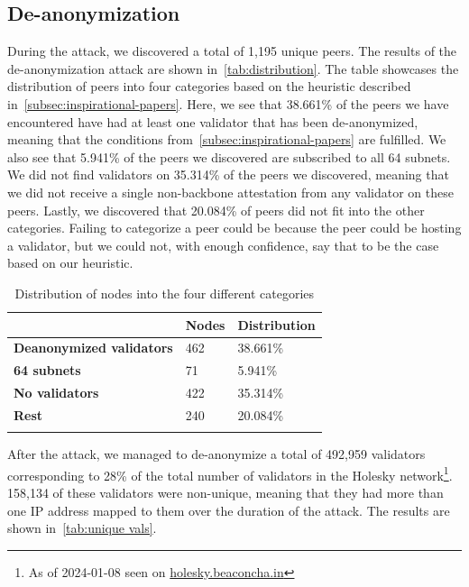 \subsection{De-anonymization}\label{subsec:de-anonymization}
During the attack, we discovered a total of 1,195 unique peers.
The results of the de-anonymization attack are shown in~\autoref{tab:distribution}.
The table showcases the distribution of peers into four categories based on the heuristic described in~\autoref{subsec:inspirational-papers}.
Here, we see that 38.661\% of the peers we have encountered have had at least one validator that has been de-anonymized, meaning that the conditions from~\autoref{subsec:inspirational-papers} are fulfilled.
We also see that 5.941\% of the peers we discovered are subscribed to all 64 subnets.
We did not find validators on 35.314\% of the peers we discovered, meaning that we did not receive a single non-backbone attestation from any validator on these peers.
Lastly, we discovered that 20.084\% of peers did not fit into the other categories.
Failing to categorize a peer could be because the peer could be hosting a validator, but we could not, with enough confidence, say that to be the case based on our heuristic.


\begin{table}[]
    \centering
    \caption{Distribution of nodes into the four different categories}
    \begin{tabular}{lll}
        \hline
        & \textbf{Nodes} & \textbf{Distribution} \\ \hline
        \textbf{Deanonymized validators} & 462            & 38.661\%                 \\
        \textbf{64 subnets}              & 71             & 5.941\%                  \\
        \textbf{No validators}           & 422              & 35.314\%               \\
        \textbf{Rest}                    & 240            & 20.084\%                 \\ \hline
        \\
    \end{tabular}
    \label{tab:distribution}
\end{table}


After the attack, we managed to de-anonymize a total of 492,959 validators corresponding to 28\% of the total number of validators in the Holesky network\footnote{As of 2024-01-08 seen on \href{https://holesky.beaconcha.in/}{holesky.beaconcha.in}}.
158,134 of these validators were non-unique, meaning that they had more than one IP address mapped to them over the duration of the attack.
The results are shown in~\autoref{tab:unique vals}.

